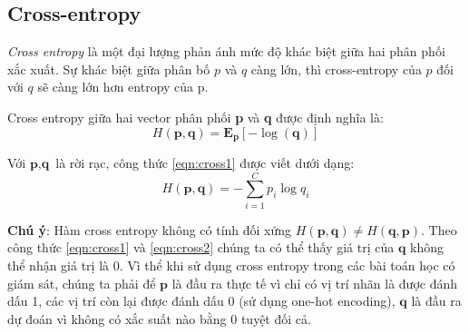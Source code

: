 \subsection{Cross-entropy}
\textit{Cross entropy} là một đại lượng phản ánh mức độ khác biệt giữa hai phân phối xắc xuất. Sự khác biệt giữa phân bố $p$ và $q$ càng lớn, thì cross-entropy của $p$ đối với $q$ sẽ càng lớn hơn entropy của p.\par 
Cross entropy giữa hai vector phân phối \textbf{p} và \textbf{q} được định nghĩa là:
\begin{equation}
\label{eqn:cross1}
H(\textbf{p},\textbf{q}) = \textbf{E}_\textbf{p}[-\log(\textbf{q})]
\end{equation}\par
	Với $\textbf{p},\textbf{q} $ là rời rạc, công thức \ref{eqn:cross1} được viết dưới dạng:
\begin{equation}
\label{eqn:cross2}
H(\textbf{p}, \textbf{q}) =-\sum_{i=1}^C p_i \log q_i 
\end{equation}\par

\textbf{Chú ý}: Hàm cross entropy không có tính đối xứng $H(\textbf{p}, \textbf{q}) \neq H(\textbf{q}, \textbf{p})$. Theo công thức \ref{eqn:cross1} và \ref{eqn:cross2} chúng ta có thể thấy giá trị của $\textbf{q}$ không thể nhận giá trị là 0. Vì thể khi sử dụng cross entropy trong các bài toán học có giám sát, chúng ta phải để $\textbf{p}$ là đầu ra thực tế vì chỉ có vị trí nhãn là được đánh dấu 1, các vị trí còn lại được đánh dấu 0 (sử dụng one-hot encoding), $\textbf{q}$ là đầu ra dự đoán vì không có xắc suất nào bằng 0 tuyệt đối cả.

